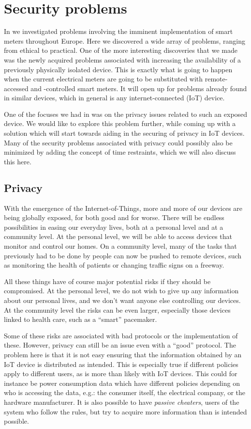 
\section{Security problems}
In \cite{prespecialization} we investigated problems involving the imminent implementation of smart meters throughout Europe.
Here we discovered a wide array of problems, ranging from ethical to practical.
One of the more interesting discoveries that we made was the newly acquired problems associated with increasing the availability of a previously physically isolated device.
This is exactly what is going to happen when the current electrical meters are going to be substituted with remote-accessed and -controlled smart meters.
It will open up for problems already found in similar devices, which in general is any internet-connected (IoT) device.

One of the focuses we had in \cite{prespecialization} was on the privacy issues related to such an exposed device.
We would like to explore this problem further, while coming up with a solution which will start towards aiding in the securing of privacy in IoT devices.
Many of the security problems associated with privacy could possibly also be minimized by adding the concept of time restraints, which we will also discuss this here.

\subsection{Privacy}
With the emergence of the Internet-of-Things, more and more of our devices are being globally exposed, for both good and for worse.
There will be endless possibilities in easing our everyday lives, both at a personal level and at a community level.
At the personal level, we will be able to access devices that monitor and control our homes.
On a community level, many of the tasks that previously had to be done by people can now be pushed to remote devices, such as monitoring the health of patients or changing traffic signs on a freeway.

All these things have of course major potential risks if they should be compromised.
At the personal level, we do not wish to give up any information about our personal lives, and we don't want anyone else controlling our devices.
At the community level the risks can be even larger, especially those devices linked to health care, such as a ``smart'' pacemaker.

Some of these risks are associated with bad protocols or the implementation of these.
However, privacy can still be an issue even with a ``good'' protocol.
The problem here is that it is not easy ensuring that the information obtained by an IoT device is distributed as intended.
This is especially true if different policies apply to different users, as is more than likely with IoT devices.
This could for instance be power consumption data which have different policies depending on who is accessing the data, e.g.: the consumer itself, the electrical company, or the hardware manufacturer.
It is also possible to have \emph{passive cheaters}, users of the system who follow the rules, but try to acquire more information than is intended possible.

